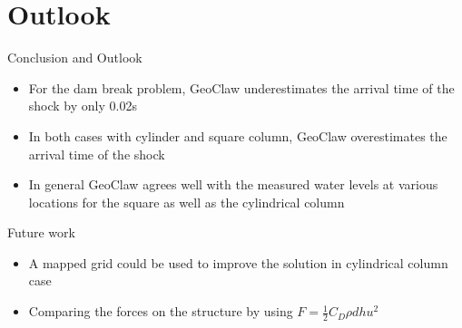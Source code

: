 \documentclass[xcolor=dvipsnames]{beamer}
\begin{document}
\section{Outlook}
\label{sec-6}
\begin{frame}[label=sec-6-1]{Conclusion and Outlook}
\begin{itemize}
\item For the dam break problem, GeoClaw underestimates the arrival time of the shock by only 0.02s
\item In both cases with cylinder and square column, GeoClaw overestimates the arrival time of the shock
\item In general GeoClaw agrees well with the measured water levels at various locations for the square as well as the cylindrical column
\end{itemize}
\begin{block}{Future work}
\begin{itemize}
\item A mapped grid could be used to improve the solution in cylindrical column case
\item Comparing the forces on the structure by using $F =\frac{1}{2}C_D\rho d hu^2$
\end{itemize}
\end{block}
\end{frame}
\end{document}
